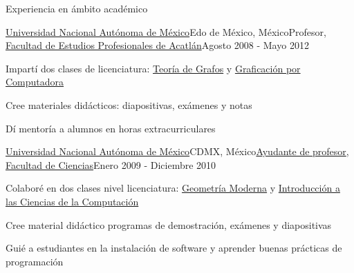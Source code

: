 \documentclass{resume} %
\begin{document}
\begin{rSection}{Experiencia en ámbito académico}
	\begin{rSubsection}{\href{http://www.unam.mx}{Universidad Nacional Autónoma de México}}{Edo de México, México}{Profesor, \href{https://www.acatlan.unam.mx}{Facultad de Estudios Profesionales de Acatlán}}{Agosto 2008 - Mayo 2012}
	\item Impartí dos clases de licenciatura: \href{https://www.acatlan.unam.mx/files/PlanesDeEstudio/MAC/4/Teoria_de_Graficas.pdf}{Teoría de Grafos} y \href{https://www.acatlan.unam.mx/files/PlanesDeEstudio/MAC/7/Graficacion_por_Computadora.pdf}{Graficación por Computadora}
	\item Cree materiales didácticos: diapositivas, exámenes y notas
	\item Dí mentoría a alumnos en horas extracurriculares
	\end{rSubsection}
	
	\begin{rSubsection}{\href{http://www.unam.mx}{Universidad Nacional Autónoma de México}}{CDMX, México}{\href{http://www.fciencias.unam.mx/directorio/63922}{Ayudante de profesor}, \href{http://www.fciencias.unam.mx/}{Facultad de Ciencias}}{Enero 2009 - Diciembre 2010}
	\item Colaboré en dos clases nivel licenciatura: \href{http://www.fciencias.unam.mx/licenciatura/asignaturas/217/249}{Geometría Moderna} y \href{http://www.fciencias.unam.mx/licenciatura/asignaturas/2017/1236}{Introducción a las Ciencias de la Computación}
	\item Cree material didáctico programas de demostración, exámenes y diapositivas
	\item Guié a estudiantes en la instalación de software y aprender buenas prácticas de programación
	\end{rSubsection}

\end{rSection}
\end{document}
